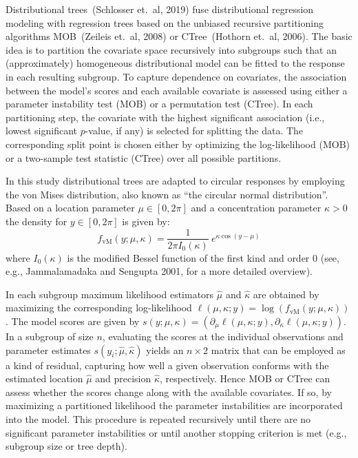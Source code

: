 \documentclass[twoside]{report}
\begin{document}
Distributional trees~(Schlosser et.~al, 2019) fuse distributional regression modeling with
regression trees based on the unbiased recursive partitioning algorithms MOB~(Zeileis et.~al, 2008)
or CTree~(Hothorn et.~al, 2006). The basic idea is to partition the covariate space recursively into 
subgroups such that an (approximately) homogeneous distributional model can be fitted to the response 
in each resulting subgroup.
To capture dependence on covariates, the association between the model's scores and each available
covariate is assessed using either a parameter instability test (MOB) or a permutation test (CTree).
In each partitioning step, the covariate with the highest significant association (i.e., lowest
significant $p$-value, if any) is selected for splitting the data. The corresponding split point
is chosen either by optimizing the log-likelihood (MOB) or a two-sample test statistic (CTree)
over all possible partitions.

In this study distributional trees are adapted to circular responses by employing the von Mises
distribution, also known as ``the circular normal distribution''. Based on a location parameter
$\mu \in [0, 2\pi]$ and a concentration parameter $\kappa > 0$ the density for $y \in [0, 2\pi]$
is given by:
\begin{equation}
  f_\mathrm{vM}(y; \mu, \kappa) = \frac{1}{2 \pi I_0(\kappa)}~e^{ \kappa \cos(y - \mu)}\label{schlosser:equ_vm}
\end{equation}
where $I_0(\kappa)$ is the modified Bessel function of the first kind and order $0$
(see, e.g., Jammalamadaka and Sengupta 2001, for a more detailed overview).

In each subgroup maximum likelihood estimators $\hat \mu$ and $\hat \kappa$ are obtained
by maximizing the corresponding log-likelihood $\ell(\mu, \kappa; y) = \log(f_\mathrm{vM}(y;\mu, \kappa))$. 
The model scores are given by  $s(y; \mu, \kappa) = (\partial_{\mu} \ell(\mu, \kappa; y),
\partial_{\kappa} \ell(\mu, \kappa; y))$. In a subgroup of size $n$, evaluating the scores
at the individual observations and parameter estimates $s(y_i; \hat{\mu}, \hat{\kappa})$
yields an $n \times 2$ matrix that can be employed as a kind of residual, capturing how well
a given observation conforms with the estimated location $\hat{\mu}$ and precision $\hat{\kappa}$, 
respectively.
Hence MOB or CTree can assess whether the scores change along with the available covariates.
If so, by maximizing a partitioned likelihood
the parameter instabilities are incorporated into the model. This procedure is repeated recursively
until there are no significant parameter instabilities or until another stopping criterion
is met (e.g., subgroup size or tree depth).
\end{document}
